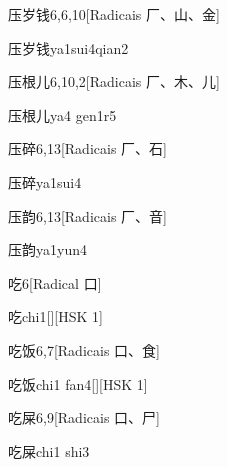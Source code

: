 \begin{entry}{压岁钱}{6,6,10}[Radicais ⼚、⼭、⾦]
  \begin{phonetics}{压岁钱}{ya1sui4qian2}
  \end{phonetics}
\end{entry}

\begin{entry}{压根儿}{6,10,2}[Radicais ⼚、⽊、⼉]
  \begin{phonetics}{压根儿}{ya4 gen1r5}
  \end{phonetics}
\end{entry}

\begin{entry}{压碎}{6,13}[Radicais ⼚、⽯]
  \begin{phonetics}{压碎}{ya1sui4}
  \end{phonetics}
\end{entry}

\begin{entry}{压韵}{6,13}[Radicais ⼚、⾳]
  \begin{phonetics}{压韵}{ya1yun4}
  \end{phonetics}
\end{entry}

\begin{entry}{吃}{6}[Radical ⼝]
  \begin{phonetics}{吃}{chi1}[][HSK 1]
  \end{phonetics}
\end{entry}

\begin{entry}{吃饭}{6,7}[Radicais ⼝、⾷]
  \begin{phonetics}{吃饭}{chi1 fan4}[][HSK 1]
  \end{phonetics}
\end{entry}

\begin{entry}{吃屎}{6,9}[Radicais ⼝、⼫]
  \begin{phonetics}{吃屎}{chi1 shi3}
  \end{phonetics}
\end{entry}

